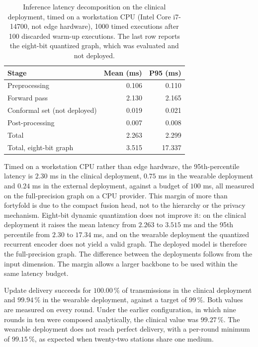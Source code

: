 \begin{table}[!t]
\centering
\caption{Inference latency decomposition on the clinical deployment, timed on a
workstation CPU (Intel Core i7-14700, not edge hardware), 1000 timed executions after 100 discarded warm-up executions. The
last row reports the eight-bit quantized graph, which was evaluated and not
deployed.}
\label{tab:latency}
\begin{tabular}{lrr}
\toprule
Stage & Mean (ms) & P95 (ms) \\
\midrule
Preprocessing              & 0.106 & 0.110 \\
Forward pass               & 2.130 & 2.165 \\
Conformal set (not deployed) & 0.019 & 0.021 \\
Post-processing            & 0.007 & 0.008 \\
\midrule
Total                      & 2.263 & 2.299 \\
Total, eight-bit graph     & 3.515 & 17.337 \\
\bottomrule
\end{tabular}
\end{table}

Timed on a workstation CPU rather than edge hardware, the 95th-percentile
latency is $2.30$ ms in the clinical deployment,
$0.75$ ms in the wearable deployment and $0.24$ ms in the external deployment,
against a budget of $100$ ms, all
measured on the full-precision graph on a CPU provider. This margin of more
than fortyfold is due to the compact fusion head, not to the hierarchy or the
privacy mechanism. Eight-bit dynamic quantization does not improve it: on the
clinical deployment it raises the mean latency from $2.263$ to $3.515$ ms and
the 95th percentile from $2.30$ to $17.34$ ms, and on the wearable deployment
the quantized recurrent encoder does not yield a valid graph. The deployed
model is therefore the full-precision graph. The difference between the deployments
follows from the input dimension. The margin allows a larger backbone to be
used within the same latency budget.

Update delivery succeeds for $100.00\,\%$ of transmissions in the clinical
deployment and $99.94\,\%$ in the wearable deployment, against a target of
$99\,\%$. Both values are measured on every round. Under the earlier
configuration, in which nine rounds in ten were composed analytically, the
clinical value was $99.27\,\%$. The wearable deployment does not reach perfect
delivery, with a per-round minimum of $99.15\,\%$, as expected when twenty-two
stations share one medium.

